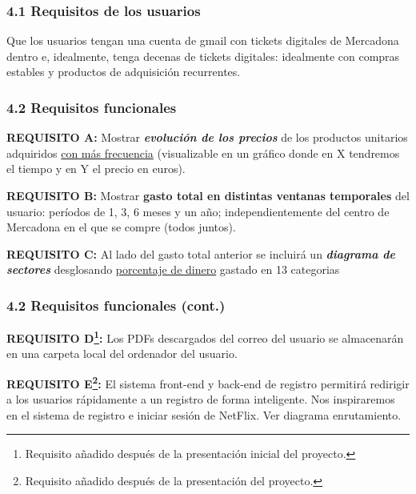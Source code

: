 \documentclass{beamer}
\begin{document}
			
			

			
			
			\begin{frame}
				\frametitle{4.1 Requisitos de los usuarios}
				
			
				Que los usuarios tengan una cuenta de gmail con tickets digitales de Mercadona dentro e, idealmente, tenga decenas de tickets digitales: idealmente con compras estables y productos de adquisición recurrentes.
	

				
				
			\end{frame}
			
	
		

		
		
	
			\begin{frame}
				\frametitle{4.2 Requisitos funcionales}
				
				
				\textbf{REQUISITO A:} Mostrar\textbf{ \textit{evolución de los precios}} de los productos unitarios adquiridos \underline{con más frecuencia} (visualizable en un gráfico donde en X tendremos el tiempo y en Y el precio en euros).
				
				\textbf{REQUISITO B:} Mostrar {\textbf{gasto total en distintas ventanas temporales}} del usuario: períodos de 1, 3, 6 meses y un año; independientemente del centro de Mercadona en el que se compre (todos juntos).
				
				\textbf{REQUISITO C:} Al lado del gasto total anterior se incluirá un \textbf{\textit{diagrama de sectores}} desglosando \underline{porcentaje de dinero} gastado en 13 categorias \href{https://shorturl.at/whzPf}{\color{blue}{(click para ver categorías)}}
				
			\end{frame}
			
			
			
						
			\begin{frame}
				\frametitle{4.2 Requisitos funcionales (cont.)}
				
			
				
				\textbf{REQUISITO D\footnote{Requisito añadido después de la presentación inicial del proyecto.}:} Los PDFs descargados del correo del usuario se almacenarán en una carpeta local del ordenador del usuario.
				
				\textbf{REQUISITO E\footnote{Requisito añadido después de la presentación del proyecto.}:} El sistema front-end y back-end de registro permitirá redirigir a los usuarios rápidamente a un registro de forma inteligente. Nos inspiraremos en el sistema de  registro e iniciar sesión de NetFlix. Ver diagrama enrutamiento.

			\end{frame}
		
\end{document}
